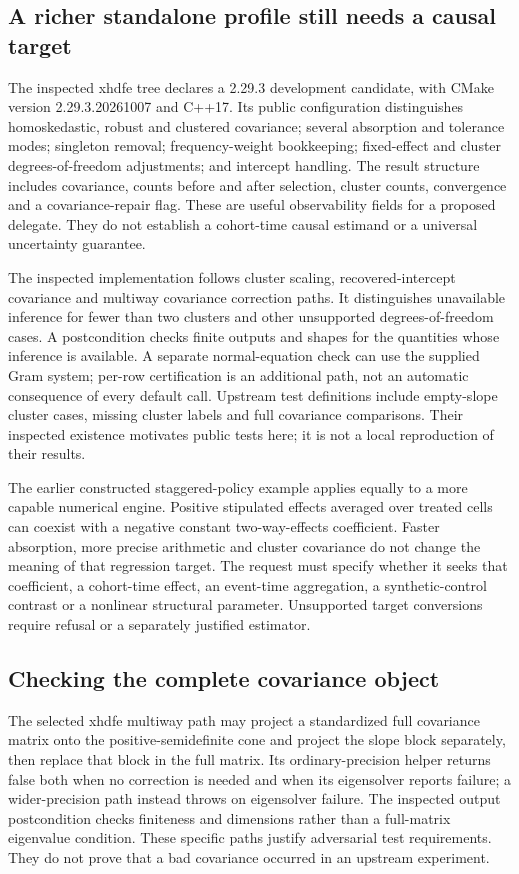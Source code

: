 \subsection{A richer standalone profile still needs a causal target}
The inspected xhdfe tree declares a 2.29.3 development candidate, with CMake
version 2.29.3.20261007 and C++17. Its public configuration distinguishes
homoskedastic, robust and clustered covariance; several absorption and
tolerance modes; singleton removal; frequency-weight bookkeeping;
fixed-effect and cluster degrees-of-freedom adjustments; and intercept
handling. The result structure includes covariance, counts before and after
selection, cluster counts, convergence and a covariance-repair flag. These
are useful observability fields for a proposed delegate. They do not
establish a cohort-time causal estimand or a universal uncertainty guarantee.
\citep{exec25_panelcxx_xhdfe}

The inspected implementation follows cluster scaling, recovered-intercept
covariance and multiway covariance correction paths. It distinguishes
unavailable inference for fewer than two clusters and other unsupported
degrees-of-freedom cases. A postcondition checks finite outputs and shapes
for the quantities whose inference is available. A separate normal-equation
check can use the supplied Gram system; per-row certification is an
additional path, not an automatic consequence of every default call.
Upstream test definitions include empty-slope cluster cases, missing cluster
labels and full covariance comparisons. Their inspected existence motivates
public tests here; it is not a local reproduction of their results.
\citep{exec25_panelcxx_xhdfe}

The earlier constructed staggered-policy example applies equally to a more
capable numerical engine. Positive stipulated effects averaged over treated
cells can coexist with a negative constant two-way-effects coefficient.
Faster absorption, more precise arithmetic and cluster covariance do not
change the meaning of that regression target. The request must specify
whether it seeks that coefficient, a cohort-time effect, an event-time
aggregation, a synthetic-control contrast or a nonlinear structural
parameter. Unsupported target conversions require refusal or a separately
justified estimator.~\citep{exec25_paneljava_reference,exec25_panelcxx_reference}

\subsection{Checking the complete covariance object}
The selected xhdfe multiway path may project a standardized full covariance
matrix onto the positive-semidefinite cone and project the slope block
separately, then replace that block in the full matrix. Its ordinary-precision
helper returns false both when no correction is needed and when its
eigensolver reports failure; a wider-precision path instead throws on
eigensolver failure. The inspected output postcondition checks finiteness
and dimensions rather than a full-matrix eigenvalue condition. These
specific paths justify adversarial test requirements. They do not prove
that a bad covariance occurred in an upstream experiment.
\citep{exec25_panelcxx_xhdfe}

